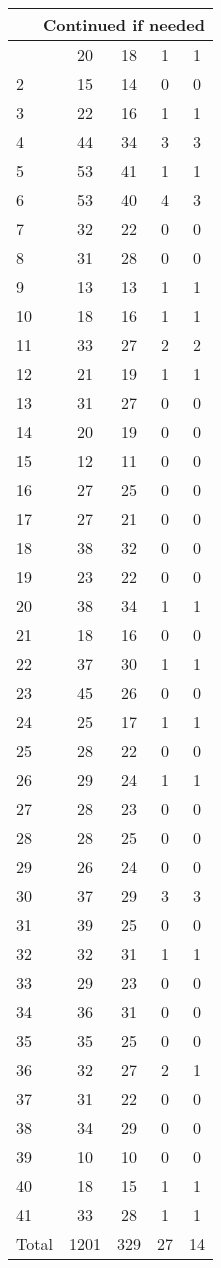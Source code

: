\begin{center}
\begin{longtable}{l|c|c|c|c}
\hline \multicolumn{5}{|r|}{{Continued if needed}} \\ \hline
\endfoot 
1 & 20 & 18 & 1 & 1\\ \hline
2 & 15 & 14 & 0 & 0\\ \hline
3 & 22 & 16 & 1 & 1\\ \hline
4 & 44 & 34 & 3 & 3\\ \hline
5 & 53 & 41 & 1 & 1\\ \hline
6 & 53 & 40 & 4 & 3\\ \hline
7 & 32 & 22 & 0 & 0\\ \hline
8 & 31 & 28 & 0 & 0\\ \hline
9 & 13 & 13 & 1 & 1\\ \hline
10 & 18 & 16 & 1 & 1\\ \hline
11 & 33 & 27 & 2 & 2\\ \hline
12 & 21 & 19 & 1 & 1\\ \hline
13 & 31 & 27 & 0 & 0\\ \hline
14 & 20 & 19 & 0 & 0\\ \hline
15 & 12 & 11 & 0 & 0\\ \hline
16 & 27 & 25 & 0 & 0\\ \hline
17 & 27 & 21 & 0 & 0\\ \hline
18 & 38 & 32 & 0 & 0\\ \hline
19 & 23 & 22 & 0 & 0\\ \hline
20 & 38 & 34 & 1 & 1\\ \hline
21 & 18 & 16 & 0 & 0\\ \hline
22 & 37 & 30 & 1 & 1\\ \hline
23 & 45 & 26 & 0 & 0\\ \hline
24 & 25 & 17 & 1 & 1\\ \hline
25 & 28 & 22 & 0 & 0\\ \hline
26 & 29 & 24 & 1 & 1\\ \hline
27 & 28 & 23 & 0 & 0\\ \hline
28 & 28 & 25 & 0 & 0\\ \hline
29 & 26 & 24 & 0 & 0\\ \hline
30 & 37 & 29 & 3 & 3\\ \hline
31 & 39 & 25 & 0 & 0\\ \hline
32 & 32 & 31 & 1 & 1\\ \hline
33 & 29 & 23 & 0 & 0\\ \hline
34 & 36 & 31 & 0 & 0\\ \hline
35 & 35 & 25 & 0 & 0\\ \hline
36 & 32 & 27 & 2 & 1\\ \hline
37 & 31 & 22 & 0 & 0\\ \hline
38 & 34 & 29 & 0 & 0\\ \hline
39 & 10 & 10 & 0 & 0\\ \hline
40 & 18 & 15 & 1 & 1\\ \hline
41 & 33 & 28 & 1 & 1\\ \hline
Total & 1201 & 329 & 27 & 14
\end{longtable}
\end{center}



